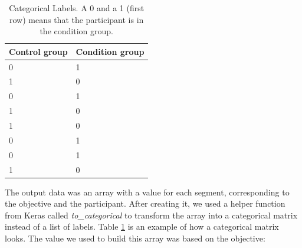 \begin{table}[h]
  \begin{center}
    \begin{tabular}{| l | l |}
      \hline
      \textbf{Control group} & \textbf{Condition group}  \\ \hline
      0                    &  1                \\ \hline
      1                    &  0                \\ \hline
      0                    &  1                \\ \hline
      1                    &  0                \\ \hline
      1                    &  0                \\ \hline
      0                    &  1                \\ \hline
      0                    &  1                \\ \hline
      1                    &  0                \\ \hline
    \end{tabular}
    \caption{Categorical Labels. A 0 and a 1 (first row) means that the participant is in the condition group.}
    \label{table:categorical_labels}
  \end{center}
\end{table}

The output data was an array with a value for each segment, corresponding to the objective and the participant. After creating it, we used a helper function from Keras called \textit{to\_categorical} to transform the array into a categorical matrix instead of a list of labels. Table \ref{table:categorical_labels} is an example of how a categorical matrix looks. The value we used to build this array was based on the objective:

